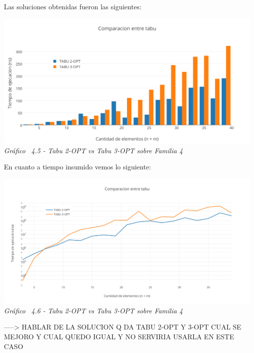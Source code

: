 Las soluciones obtenidas fueron las siguientes:

\vspace*{0.3cm} \vspace*{0.3cm}
  \begin{center}
 \includegraphics[scale=0.5]{./EJ4/comparativogym0.png}\\
 {            \textit{Gráfico \ 4.5 - Tabu 2-OPT vs Tabu 3-OPT sobre Familia 4}}
  \end{center}
  \vspace*{0.3cm}

En cuanto a tiempo insumido vemos lo siguiente:

\vspace*{0.3cm} \vspace*{0.3cm}
  \begin{center}
 \includegraphics[scale=0.5]{./EJ4/comparaciongym01.png}\\
 {            \textit{Gráfico \ 4.6 - Tabu 2-OPT vs Tabu 3-OPT sobre Familia 4}}
  \end{center}
  \vspace*{0.3cm}

  
-----> HABLAR DE LA SOLUCION Q DA TABU 2-OPT Y 3-OPT CUAL SE MEJORO Y CUAL QUEDO IGUAL Y NO SERVIRIA USARLA EN ESTE CASO

